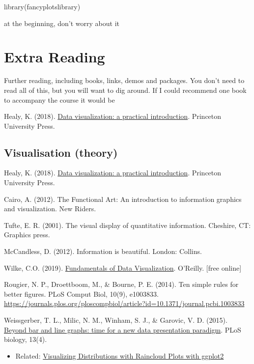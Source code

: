 \documentclass[
]{book}
\providecommand{\tightlist}{%
  \setlength{\itemsep}{0pt}\setlength{\parskip}{0pt}}
\begin{document}
library(fancyplotslibrary)

at the beginning, don't worry about it

\hypertarget{extra-reading}{%
\chapter{Extra Reading}\label{extra-reading}}

Further reading, including books, links, demos and packages. You don't need to read all of this, but you will want to dig around. If I could recommend one book to accompany the course it would be

Healy, K. (2018). \href{https://socviz.co/}{Data visualization: a practical introduction}. Princeton University Press.

\hypertarget{visualisation-theory}{%
\section{Visualisation (theory)}\label{visualisation-theory}}

Healy, K. (2018). \href{https://socviz.co/}{Data visualization: a practical introduction}. Princeton University Press.

Cairo, A. (2012). The Functional Art: An introduction to information graphics and visualization. New Riders.

Tufte, E. R. (2001). The visual display of quantitative information. Cheshire, CT: Graphics press.

McCandless, D. (2012). Information is beautiful. London: Collins.

Wilke, C.O. (2019). \href{https://clauswilke.com/dataviz/index.html}{Fundamentals of Data Visualization}. O'Reilly. {[}free online{]}

Rougier, N. P., Droettboom, M., \& Bourne, P. E. (2014). Ten simple rules for better figures. PLoS Comput Biol, 10(9), e1003833. \url{https://journals.plos.org/ploscompbiol/article?id=10.1371/journal.pcbi.1003833}

Weissgerber, T. L., Milic, N. M., Winham, S. J., \& Garovic, V. D. (2015). \href{https://journals.plos.org/plosbiology/article?id=10.1371/journal.pbio.1002128}{Beyond bar and line graphs: time for a new data presentation paradigm}. PLoS biology, 13(4).

\begin{itemize}
\tightlist
\item
  Related: \href{https://www.cedricscherer.com/2021/06/06/visualizing-distributions-with-raincloud-plots-with-ggplot2/}{Visualizing Distributions with Raincloud Plots with ggplot2}
\end{itemize}
\end{document}
